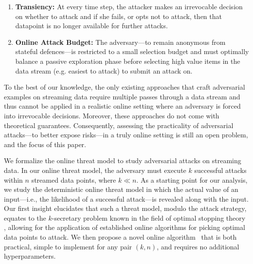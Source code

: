 \begin{enumerate}[noitemsep,topsep=0pt,parsep=0pt,partopsep=0pt, leftmargin=*] 
    \item \textbf{Transiency:} At every time step, the attacker makes an irrevocable decision on whether to attack and if she fails, or opts not to attack, then that datapoint is no longer available for further attacks.
    \item \textbf{Online Attack Budget:} The adversary---to remain anonymous from stateful defences---is restricted to a small selection budget and must optimally balance a passive exploration phase before selecting high value items in the data stream (e.g. easiest to attack) to submit an attack on.
\end{enumerate}

To the best of our knowledge, the only existing approaches that craft adversarial examples on streaming data \citep{gong2019real,lin2017tactics,sun2020stealthy} require multiple passes through a data stream and thus cannot be applied in a realistic online setting where an adversary is forced into irrevocable decisions. Moreover, these approaches do not come with theoretical guarantees. Consequently, assessing the practicality of adversarial attacks---to better expose risks---in a truly online setting is still an open problem, and the focus of this paper. %


We formalize the online threat model to study adversarial attacks on streaming data. In our online threat model, the adversary must execute $k$ successful attacks within $n$  streamed data points, where $k \ll n$. As a starting point for our analysis, we study the deterministic online threat model in which the actual value of an input---i.e., the likelihood of a successful attack---is revealed along with the input. Our first insight elucidates that such a threat model, modulo the attack strategy, equates to the $k$-secretary problem known in the field of optimal stopping theory \cite{dynkin1963optimum,kleinberg2005multiple}, allowing for the application of established online algorithms for picking optimal data points to attack. We then propose a novel online algorithm \algoname\ that is both practical, simple to implement for any pair $(k,n)$, and requires no additional hyperparameters.%
 

